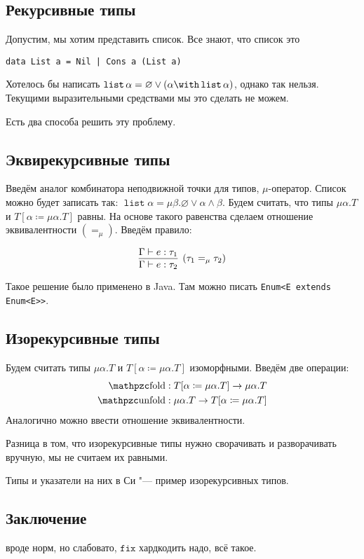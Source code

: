\subsection{\texorpdfstring{Рекурсивные типы}{Recursive types}}
Допустим, мы хотим представить список. Все знают, что список это 
\begin{verbatim}
data List a = Nil | Cons a (List a)
\end{verbatim}
Хотелось бы написать $\operatorname{\mathtt{list}}\alpha=\varnothing\lor(\alpha\with\operatorname{\mathtt{list}}\alpha)$,
однако так нельзя.
Текущими выразительными средствами мы это сделать не можем.

Есть два способа решить эту проблему.

\subsection*{\texorpdfstring{Эквирекурсивные типы}{Equirecursive types}}
Введём аналог комбинатора неподвижной точки для типов, $\mu$-оператор.
Список можно будет записать так: $\operatorname{\mathtt{list}} \alpha = \mu \beta . \varnothing \lor \alpha \land \beta$.
Будем считать, что типы $\mu \alpha . T$ и $T[\alpha \coloneqq \mu \alpha.T]$ равны.
На основе такого равенства сделаем отношение эквивалентности $(=_\mu)$.
Введём правило:
\begin{bnf}
\[
    \infer[(\tau_1=_\mu \tau_2)]
        {\Gamma \vdash e : \tau_2}
        {\Gamma \vdash e : \tau_1}
\]
\end{bnf}

Такое решение было применено в Java. Там можно писать \texttt{Enum<E extends Enum<E>>}.

\subsection*{\texorpdfstring{Изорекурсивные типы}{Isorecursive types}}
Будем считать типы $\mu \alpha . T$ и $T[\alpha \coloneqq \mu \alpha.T]$ изоморфными.
Введём две операции:
\begin{align*}
    \comb{fold}   &: T[\alpha \coloneqq \mu \alpha.T] \rightarrow \mu \alpha . T \\
    \comb{unfold} &: \mu \alpha . T \rightarrow T[\alpha \coloneqq \mu \alpha.T]
\end{align*}
Аналогично можно ввести отношение эквивалентности.

Разница в том, что изорекурсивные типы нужно сворачивать и разворачивать вручную, мы не считаем их равными.

Типы и указатели на них в Си "--- пример изорекурсивных типов.

\subsection*{\texorpdfstring{Заключение}{Conclusion}}
\todo вроде норм, но слабовато, $\mathtt{fix}$ хардкодить надо, всё такое.
